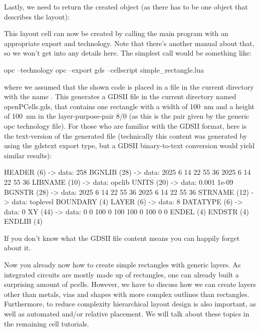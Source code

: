 Lastly, we need to return the created object (as there has to be one object that describes the layout):

This layout cell can now be created by calling the main program with an appropriate export and technology.
Note that there's another manual about that, so we won't get into any details here.
The simplest call would be something like:
\begin{shellcode}
    opc --technology opc --export gds --cellscript simple_rectangle.lua
\end{shellcode}
where we assumed that the shown code is placed in a file in the current directory with the name .
This generates a GDSII file in the current directory named openPCells.gds, that contains one rectangle with a width of \qty{100}{\nano\meter} and a height of \qty{100}{\nano\meter} in the layer-purpose-pair 8/0 (as this is the pair given by the generic opc technology file).
For those who are familiar with the GDSII format, here is the text-version of the generated file (technically this content was generated by using the gdstext export type, but a GDSII binary-to-text conversion would yield similar results):
\begin{shellcode}
      HEADER (6) -> data: 258
      BGNLIB (28) -> data: 2025 6 14 22 55 36 2025 6 14 22 55 36
     LIBNAME (10) -> data: opclib
       UNITS (20) -> data: 0.001 1e-09
      BGNSTR (28) -> data: 2025 6 14 22 55 36 2025 6 14 22 55 36
     STRNAME (12) -> data: toplevel
    BOUNDARY (4)
       LAYER (6) -> data: 8
    DATATYPE (6) -> data: 0
          XY (44) -> data: 0 0 100 0 100 100 0 100 0 0
       ENDEL (4)
      ENDSTR (4)
      ENDLIB (4)
\end{shellcode}
If you don't know what the GDSII file content means you can happily forget about it.

Now you already now how to create simple rectangles with generic layers.
As integrated circuits are mostly made up of rectangles, one can already built a surprising amount of pcells.
However, we have to discuss how we can create layers other than metals, vias and shapes with more complex outlines than rectangles.
Furthermore, to reduce complexity hierarchical layout design is also important, as well as automated and/or relative placement.
We will talk about these topics in the remaining cell tutorials.

